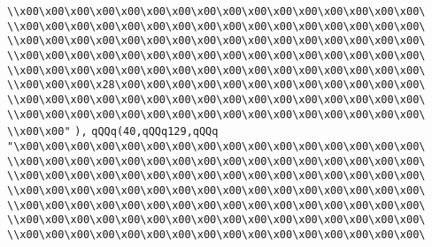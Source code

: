 \verb|\\x00\x00\x00\x00\x00\x00\x00\x00\x00\x00\x00\x00\x00\x00\x00\x00\|\newline
\verb|\\x00\x00\x00\x00\x00\x00\x00\x00\x00\x00\x00\x00\x00\x00\x00\x00\|\newline
\verb|\\x00\x00\x00\x00\x00\x00\x00\x00\x00\x00\x00\x00\x00\x00\x00\x00\|\newline
\verb|\\x00\x00\x00\x00\x00\x00\x00\x00\x00\x00\x00\x00\x00\x00\x00\x00\|\newline
\verb|\\x00\x00\x00\x00\x00\x00\x00\x00\x00\x00\x00\x00\x00\x00\x00\x00\|\newline
\verb|\\x00\x00\x00\x28\x00\x00\x00\x00\x00\x00\x00\x00\x00\x00\x00\x00\|\newline
\verb|\\x00\x00\x00\x00\x00\x00\x00\x00\x00\x00\x00\x00\x00\x00\x00\x00\|\newline
\verb|\\x00\x00\x00\x00\x00\x00\x00\x00\x00\x00\x00\x00\x00\x00\x00\x00\|\newline
\verb|\\x00\x00"|\newline
\verb|),|\newline
\verb|qQQq(40,qQQq129,qQQq|\newline
\verb|"\x00\x00\x00\x00\x00\x00\x00\x00\x00\x00\x00\x00\x00\x00\x00\x00\|\newline
\verb|\\x00\x00\x00\x00\x00\x00\x00\x00\x00\x00\x00\x00\x00\x00\x00\x00\|\newline
\verb|\\x00\x00\x00\x00\x00\x00\x00\x00\x00\x00\x00\x00\x00\x00\x00\x00\|\newline
\verb|\\x00\x00\x00\x00\x00\x00\x00\x00\x00\x00\x00\x00\x00\x00\x00\x00\|\newline
\verb|\\x00\x00\x00\x00\x00\x00\x00\x00\x00\x00\x00\x00\x00\x00\x00\x00\|\newline
\verb|\\x00\x00\x00\x00\x00\x00\x00\x00\x00\x00\x00\x00\x00\x00\x00\x00\|\newline
\verb|\\x00\x00\x00\x00\x00\x00\x00\x00\x00\x00\x00\x00\x00\x00\x00\x00\|\newline
